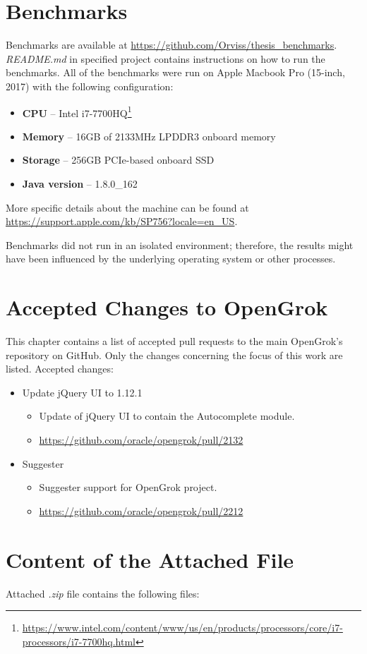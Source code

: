 \chapter{Benchmarks}
\label{benchmark_attachment}

Benchmarks are available at \url{https://github.com/Orviss/thesis_benchmarks}. \textit{README.md} in specified project
contains instructions on how to run the benchmarks. All of the benchmarks were run on Apple Macbook Pro (15-inch, 2017)
with the following configuration:
\begin{itemize}
    \item \textbf{CPU} – Intel i7-7700HQ\footnote{\url{https://www.intel.com/content/www/us/en/products/processors/core/i7-processors/i7-7700hq.html}}
    \item \textbf{Memory} – 16GB of 2133MHz LPDDR3 onboard memory
    \item \textbf{Storage} – 256GB PCIe-based onboard SSD
    \item \textbf{Java version} – 1.8.0\_162
\end{itemize}

More specific details about the machine can be found at \url{https://support.apple.com/kb/SP756?locale=en_US}.

Benchmarks did not run in an isolated environment; therefore, the results might have been influenced by the underlying
operating system or other processes.

\chapter{Accepted Changes to OpenGrok}
This chapter contains a list of accepted pull requests to the main OpenGrok's repository on GitHub. Only the changes
concerning the focus of this work are listed.
Accepted changes:
\begin{itemize}
    \item Update jQuery UI to 1.12.1
    \begin{itemize}
        \item Update of jQuery UI to contain the Autocomplete module.
        \item \url{https://github.com/oracle/opengrok/pull/2132}
    \end{itemize}
    \item Suggester
    \begin{itemize}
        \item Suggester support for OpenGrok project.
        \item \url{https://github.com/oracle/opengrok/pull/2212}
    \end{itemize}
\end{itemize}

\chapter{Content of the Attached File}
Attached \textit{.zip} file contains the following files:
\bigskip
{}
